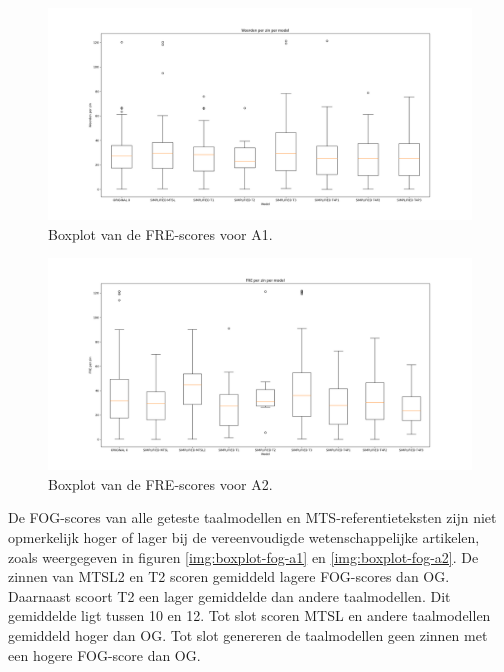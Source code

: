\begin{figure}[H]
	\includegraphics[width=\linewidth]{img/boxplot-fre-a1.png}
	\caption{Boxplot van de FRE-scores voor A1.}
	\label{img:boxplot-fre-a1}
\end{figure}

\begin{figure}[H]
	\includegraphics[width=\linewidth]{img/boxplot-fre-a2.png}
	\caption{Boxplot van de FRE-scores voor A2.}
	\label{img:boxplot-fre-a2}
\end{figure}

De FOG-scores van alle geteste taalmodellen en MTS-referentieteksten zijn niet opmerkelijk hoger of lager bij de vereenvoudigde wetenschappelijke artikelen, zoals weergegeven in figuren \ref{img:boxplot-fog-a1} en \ref{img:boxplot-fog-a2}. De zinnen van MTSL2 en T2 scoren gemiddeld lagere FOG-scores dan OG. Daarnaast scoort T2 een lager gemiddelde dan andere taalmodellen. Dit gemiddelde ligt tussen 10 en 12. Tot slot scoren MTSL en andere taalmodellen gemiddeld hoger dan OG. Tot slot genereren de taalmodellen geen zinnen met een hogere FOG-score dan OG.

